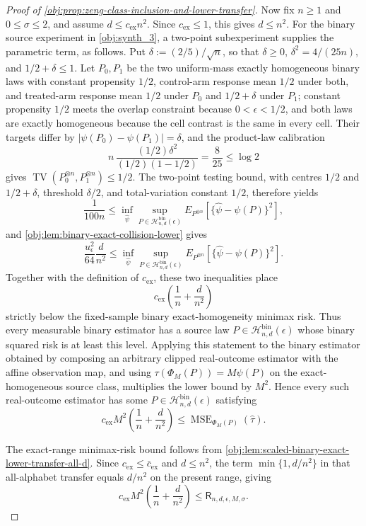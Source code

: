 \documentclass[11pt]{article}
\begin{document}
\begin{proof}[Proof of \cref{obj:prop:zeng-class-inclusion-and-lower-transfer}]
Now fix \(n\ge1\) and \(0\le\sigma\le2\), and assume \(d\le c_{\mathrm{ex}}n^2\).  Since \(c_{\mathrm{ex}}\le1\), this gives \(d\le n^2\).  For the binary source experiment in \cref{obj:synth_3}, a two-point subexperiment supplies the parametric term, as follows.  Put \(\delta:=(2/5)/\sqrt n\), so that \(\delta\ge0\), \(\delta^2=4/(25n)\), and \(1/2+\delta\le1\).  Let \(P_0,P_1\) be the two uniform-mass exactly homogeneous binary laws with constant propensity \(1/2\), control-arm response mean \(1/2\) under both, and treated-arm response mean \(1/2\) under \(P_0\) and \(1/2+\delta\) under \(P_1\); constant propensity \(1/2\) meets the overlap constraint because \(0<\epsilon<1/2\), and both laws are exactly homogeneous because the cell contrast is the same in every cell.  Their targets differ by \(|\psi(P_0)-\psi(P_1)|=\delta\), and the product-law calibration
\[
n\,\frac{(1/2)\delta^2}{(1/2)(1-1/2)}
=
\frac{8}{25}
\le\log 2
\]
gives \(\operatorname{TV}(P_0^{\otimes n},P_1^{\otimes n})\le1/2\).  The two-point testing bound, with centres \(1/2\) and \(1/2+\delta\), threshold \(\delta/2\), and total-variation constant \(1/2\), therefore yields
\[
\frac1{100n}
\le
\inf_{\widehat\psi}\sup_{P\in\mathcal H_{n,d}^{\mathrm{bin}}(\epsilon)}
E_{P^{\otimes n}}\!\left[\{\widehat\psi-\psi(P)\}^2\right],
\]
and \cref{obj:lem:binary-exact-collision-lower} gives
\[
\frac{u_{\epsilon}^2}{64}\frac d{n^2}
\le
\inf_{\widehat\psi}\sup_{P\in\mathcal H_{n,d}^{\mathrm{bin}}(\epsilon)}
E_{P^{\otimes n}}\!\left[\{\widehat\psi-\psi(P)\}^2\right].
\]
Together with the definition of \(c_{\mathrm{ex}}\), these two inequalities place
\[
c_{\mathrm{ex}}\left(\frac1n+\frac d{n^2}\right)
\]
strictly below the fixed-sample binary exact-homogeneity minimax risk.  Thus every measurable binary estimator has a source law \(P\in\mathcal H_{n,d}^{\mathrm{bin}}(\epsilon)\) whose binary squared risk is at least this level.  Applying this statement to the binary estimator obtained by composing an arbitrary clipped real-outcome estimator with the affine observation map, and using \(\tau(\Phi_M(P))=M\psi(P)\) on the exact-homogeneous source class, multiplies the lower bound by \(M^2\).  Hence every such real-outcome estimator has some \(P\in\mathcal H_{n,d}^{\mathrm{bin}}(\epsilon)\) satisfying
\[
c_{\mathrm{ex}}M^2\left(\frac1n+\frac d{n^2}\right)
\le
\operatorname{MSE}_{\Phi_M(P)}(\widehat\tau).
\]

The exact-range minimax-risk bound follows from \cref{obj:lem:scaled-binary-exact-lower-transfer-all-d}.  Since \(c_{\mathrm{ex}}\le\bar c_{\mathrm{ex}}\) and \(d\le n^2\), the term \(\min\{1,d/n^2\}\) in that all-alphabet transfer equals \(d/n^2\) on the present range, giving
\[
c_{\mathrm{ex}}M^2\left(\frac1n+\frac d{n^2}\right)
\le
\mathsf R_{n,d,\epsilon,M,\sigma}.
\]


\end{proof}
\end{document}
